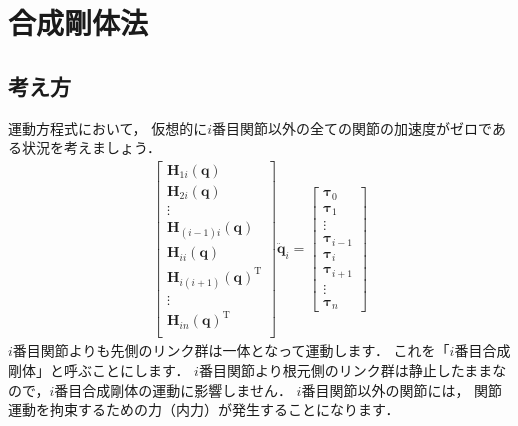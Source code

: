 \documentclass{jsarticle}
\begin{document}
\section{合成剛体法}

\subsection{考え方}

運動方程式において，
仮想的に$i$番目関節以外の全ての関節の加速度がゼロである状況を考えましょう．
\begin{align*}
\left[\begin{array}{c}
\bm{H}_{1i}(\bm{q}) \\
\bm{H}_{2i}(\bm{q}) \\
\vdots \\
\bm{H}_{(i-1)i}(\bm{q}) \\
\bm{H}_{ii}(\bm{q}) \\
\bm{H}_{i(i+1)}(\bm{q})^{\mathrm{T}} \\
\vdots \\
\bm{H}_{in}(\bm{q})^{\mathrm{T}} \\
\end{array}\right]
\ddot{\bm{q}}_{i}
=
\left[\begin{array}{c}
\bm{\tau}_{0} \\
\bm{\tau}_{1} \\
\vdots \\
\bm{\tau}_{i-1} \\
\bm{\tau}_{i} \\
\bm{\tau}_{i+1} \\
\vdots \\
\bm{\tau}_{n}
\end{array}\right]
\end{align*}
$i$番目関節よりも先側のリンク群は一体となって運動します．
これを「$i$番目合成剛体」と呼ぶことにします．
$i$番目関節より根元側のリンク群は静止したままなので，$i$番目合成剛体の運動に影響しません．
$i$番目関節以外の関節には，
関節運動を拘束するための力（内力）が発生することになります．
\end{document}
